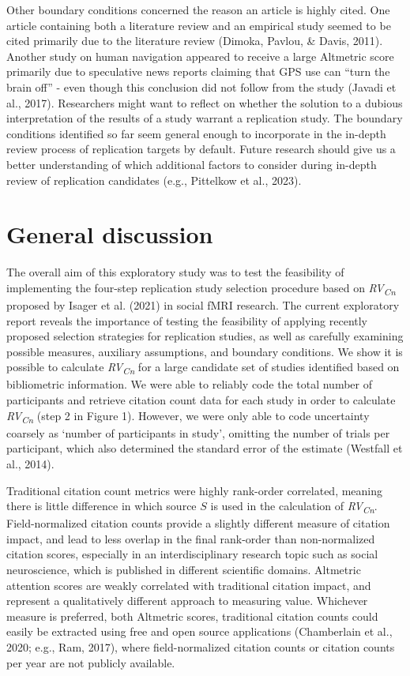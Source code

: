 \documentclass[
  man,floatsintext]{apa6}
\begin{document}
Other boundary conditions concerned the reason an article is highly cited. One article containing both a literature review and an empirical study seemed to be cited primarily due to the literature review (Dimoka, Pavlou, \& Davis, 2011). Another study on human navigation appeared to receive a large Altmetric score primarily due to speculative news reports claiming that GPS use can ``turn the brain off'' - even though this conclusion did not follow from the study (Javadi et al., 2017). Researchers might want to reflect on whether the solution to a dubious interpretation of the results of a study warrant a replication study. The boundary conditions identified so far seem general enough to incorporate in the in-depth review process of replication targets by default. Future research should give us a better understanding of which additional factors to consider during in-depth review of replication candidates (e.g., Pittelkow et al., 2023).

\hypertarget{general-discussion}{%
\section{General discussion}\label{general-discussion}}

The overall aim of this exploratory study was to test the feasibility of implementing the four-step replication study selection procedure based on \emph{RV\textsubscript{Cn}} proposed by Isager et al. (2021) in social fMRI research. The current exploratory report reveals the importance of testing the feasibility of applying recently proposed selection strategies for replication studies, as well as carefully examining possible measures, auxiliary assumptions, and boundary conditions. We show it is possible to calculate \emph{RV\textsubscript{Cn}} for a large candidate set of studies identified based on bibliometric information. We were able to reliably code the total number of participants and retrieve citation count data for each study in order to calculate \emph{RV\textsubscript{Cn}} (step 2 in Figure 1). However, we were only able to code uncertainty coarsely as `number of participants in study', omitting the number of trials per participant, which also determined the standard error of the estimate (Westfall et al., 2014).

Traditional citation count metrics were highly rank-order correlated, meaning there is little difference in which source \(S\) is used in the calculation of \emph{RV\textsubscript{Cn}}. Field-normalized citation counts provide a slightly different measure of citation impact, and lead to less overlap in the final rank-order than non-normalized citation scores, especially in an interdisciplinary research topic such as social neuroscience, which is published in different scientific domains. Altmetric attention scores are weakly correlated with traditional citation impact, and represent a qualitatively different approach to measuring value. Whichever measure is preferred, both Altmetric scores, traditional citation counts could easily be extracted using free and open source applications (Chamberlain et al., 2020; e.g., Ram, 2017), where field-normalized citation counts or citation counts per year are not publicly available.
\end{document}
